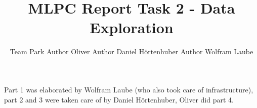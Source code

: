 \documentclass{article}
\title{MLPC Report Task 2 - Data Exploration}
\author{%
  Team Park \AND
  Author Oliver
  \And
  Author Daniel Hörtenhuber
  \And 
  Author Wolfram Laube
}
\begin{document}
\maketitle


\begin{contributions}
  Part 1 was elaborated by Wolfram Laube (who also took care of infrastructure), part 2 and 3 were taken care of by Daniel Hörtenhuber,
  Oliver did part 4.
\end{contributions}








\end{document}
